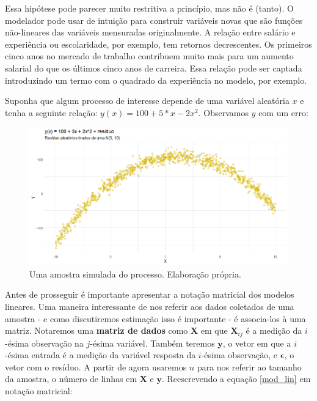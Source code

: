 Essa hipótese pode parecer muito restritiva a princípio, mas não é (tanto). O modelador pode usar de intuição para construir variáveis novas que são funções não-lineares das variáveis mensuradas originalmente. A relação entre salário e experiência ou escolaridade, por exemplo, tem retornos decrescentes. Os primeiros cinco anos no mercado de trabalho contribuem muito mais para um aumento salarial do que os últimos cinco anos de carreira. Essa relação pode ser captada introduzindo um termo com o quadrado da experiência no modelo, por exemplo. 

\begin{exemplo}

Suponha que algum processo de interesse depende de uma variável aleatória $x$ e tenha a seguinte relação: $y(x) = 100 + 5*x - 2x^2$. Observamos $y$ com um erro:

\begin{figure}[]
    \centering
    \includegraphics[scale = .60]{imagens/exemplo3_dist.png}
    \caption{Uma amostra simulada do processo. Elaboração própria.}
\end{figure}



\end{exemplo}

Antes de prosseguir é importante apresentar a notação matricial dos modelos lineares. Uma maneira interessante de nos referir aos dados coletados de uma amostra - e como discutiremos estimação isso é importante - é associa-los à uma matriz. Notaremos uma \textbf{matriz de dados} como $\mathbf{X}$ em que $\mathbf{X}_{ij}$ é a medição da $i$-ésima observação na $j$-ésima variável. Também teremos $\mathbf{y}$, o vetor em que a $i$-ésima entrada é a medição da variável resposta da $i$-ésima observação, e $\mathbf{\epsilon}$, o vetor com o resíduo. A partir de agora usaremos $n$ para nos referir ao tamanho da amostra, o número de linhas em $\mathbf{X}$ e $\mathbf{y}$. Reescrevendo a equação \ref{mod_lin} em notação matricial:

